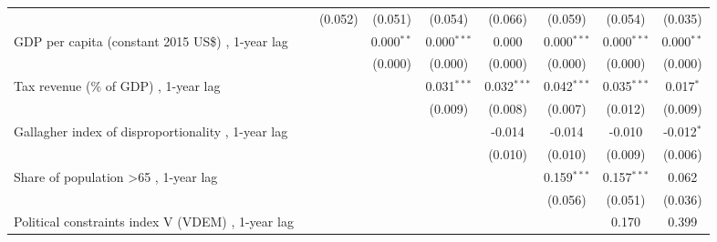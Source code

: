 \begin{table}[htbp]
\begin{tabular}{lcccccccc}
                                                                                                        &                & (0.052)       & (0.051)       & (0.054)       & (0.066)       & (0.059)       & (0.054)       & (0.035)\\   
      GDP per capita (constant 2015 US\$) , 1-year lag                                                  &                &               & 0.000$^{**}$  & 0.000$^{***}$ & 0.000         & 0.000$^{***}$ & 0.000$^{***}$ & 0.000$^{**}$\\   
                                                                                                        &                &               & (0.000)       & (0.000)       & (0.000)       & (0.000)       & (0.000)       & (0.000)\\   
      Tax revenue (\% of GDP) , 1-year lag                                                              &                &               &               & 0.031$^{***}$ & 0.032$^{***}$ & 0.042$^{***}$ & 0.035$^{***}$ & 0.017$^{*}$\\   
                                                                                                        &                &               &               & (0.009)       & (0.008)       & (0.007)       & (0.012)       & (0.009)\\   
      Gallagher index of disproportionality , 1-year lag                                                &                &               &               &               & -0.014        & -0.014        & -0.010        & -0.012$^{*}$\\   
                                                                                                        &                &               &               &               & (0.010)       & (0.010)       & (0.009)       & (0.006)\\   
      Share of population >65 , 1-year lag                                                              &                &               &               &               &               & 0.159$^{***}$ & 0.157$^{***}$ & 0.062\\   
                                                                                                        &                &               &               &               &               & (0.056)       & (0.051)       & (0.036)\\   
      Political constraints index V (VDEM) , 1-year lag                                                 &                &               &               &               &               &               & 0.170         & 0.399\\   

\end{tabular}
\end{table}
